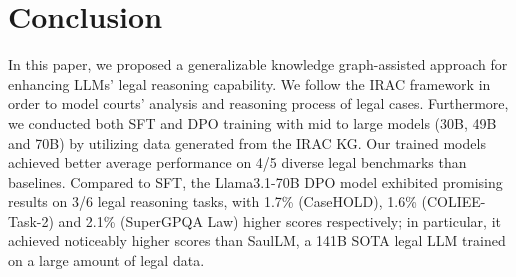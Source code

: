\section{Conclusion}
\label{section:conclusion}

In this paper, we proposed a generalizable knowledge graph-assisted approach for enhancing LLMs' legal reasoning capability. We follow the IRAC framework in order to model courts' analysis and reasoning process of legal cases. Furthermore, we conducted both SFT and DPO training with mid to large models (30B, 49B and 70B) by utilizing data generated from the IRAC KG. Our trained models achieved better average performance on 4/5 diverse legal benchmarks than baselines. Compared to SFT, the Llama3.1-70B DPO model exhibited promising results on 3/6 legal reasoning tasks, with 1.7\% (CaseHOLD), 1.6\% (COLIEE-Task-2) and 2.1\% (SuperGPQA Law) higher scores respectively; in particular, it achieved noticeably higher scores than SaulLM, a 141B SOTA legal LLM trained on a large amount of legal data.